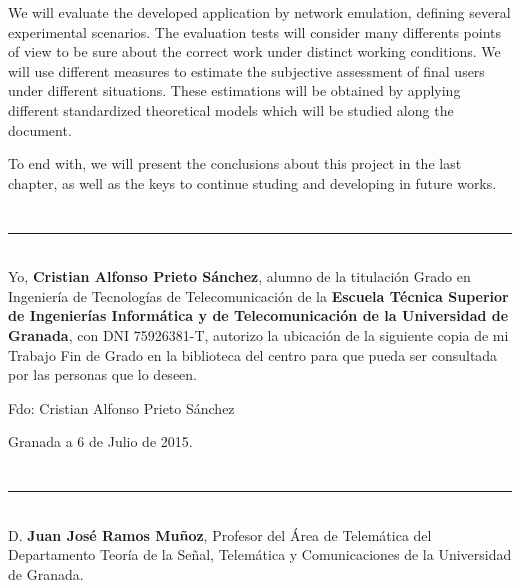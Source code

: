 We will evaluate the developed application by network emulation, defining several experimental scenarios.  The evaluation tests will consider many differents points of view to be sure about the correct work under distinct working conditions. We will use different measures to estimate the subjective assessment of final users under different situations. These estimations will be obtained by applying different standardized theoretical models which will be studied along the document.

To end with, we will present the conclusions about this project in the last chapter, as well as the keys to continue studing and developing in future works.


\chapter*{}
\thispagestyle{empty}

\noindent\rule[-1ex]{\textwidth}{2pt}\\[4.5ex]

Yo, \textbf{Cristian Alfonso Prieto Sánchez}, alumno de la titulación Grado en Ingeniería de Tecnologías de Telecomunicación de la \textbf{Escuela Técnica Superior
de Ingenierías Informática y de Telecomunicación de la Universidad de Granada}, con DNI 75926381-T, autorizo la
ubicación de la siguiente copia de mi Trabajo Fin de Grado en la biblioteca del centro para que pueda ser
consultada por las personas que lo deseen.

\vspace{6cm}

\noindent Fdo: Cristian Alfonso Prieto Sánchez

\vspace{2cm}

\begin{flushright}
Granada a 6 de Julio de 2015.
\end{flushright}


\chapter*{}
\thispagestyle{empty}

\noindent\rule[-1ex]{\textwidth}{2pt}\\[4.5ex]

D. \textbf{Juan José Ramos Muñoz}, Profesor del Área de Telemática del Departamento Teoría de la Señal, Telemática y Comunicaciones de la Universidad de Granada.

\vspace{0.5cm}


